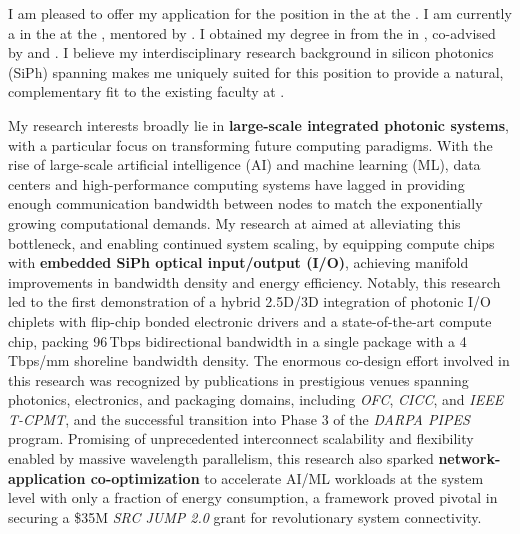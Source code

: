 I am pleased to offer my application for the \appPosition{} position \appJobID{} in the \appDept{} at the \appSchool{}. I am currently a \myTitle{} in the \myDept{} at the \mySchoolShort{}, mentored by \mySuper{}. I obtained my \myDegree{} degree in \myMajor{} from the \myPhDSchool{} in \myPhDYear{}, co-advised by \myAdvisor{} and \myCoAdvisor{}. I believe my interdisciplinary research background in silicon photonics (SiPh) spanning \appArea{} makes me uniquely suited for this position to provide a natural, complementary fit to the existing faculty at \appSchoolDeptShort{}.

My research interests broadly lie in \textbf{large-scale integrated photonic systems}, with a particular focus on transforming future computing paradigms. With the rise of large-scale artificial intelligence (AI) and machine learning (ML), data centers and high-performance computing systems have lagged in providing enough communication bandwidth between nodes to match the exponentially growing computational demands. My research at \mySchoolShort{} aimed at alleviating this bottleneck, and enabling continued system scaling, by equipping compute chips with \textbf{embedded SiPh optical input/output (I/O)}, achieving manifold improvements in bandwidth density and energy efficiency. Notably, this research led to the first demonstration of a hybrid 2.5D/3D integration of photonic I/O chiplets with flip-chip bonded electronic drivers and a state-of-the-art compute chip, packing 96\,Tbps bidirectional bandwidth in a single package with a 4\,Tbps/mm shoreline bandwidth density. The enormous co-design effort involved in this research was recognized by publications in prestigious venues spanning photonics, electronics, and packaging domains, including \emph{OFC}, \emph{CICC}, and \emph{IEEE T-CPMT}, and the successful transition into Phase 3 of the \emph{DARPA PIPES} program. Promising of unprecedented interconnect scalability and flexibility enabled by massive wavelength parallelism, this research also sparked \textbf{network-application co-optimization} to accelerate AI/ML workloads at the system level with only a fraction of energy consumption, a framework proved pivotal in securing a \$35M \emph{SRC JUMP 2.0} grant for revolutionary system connectivity.

